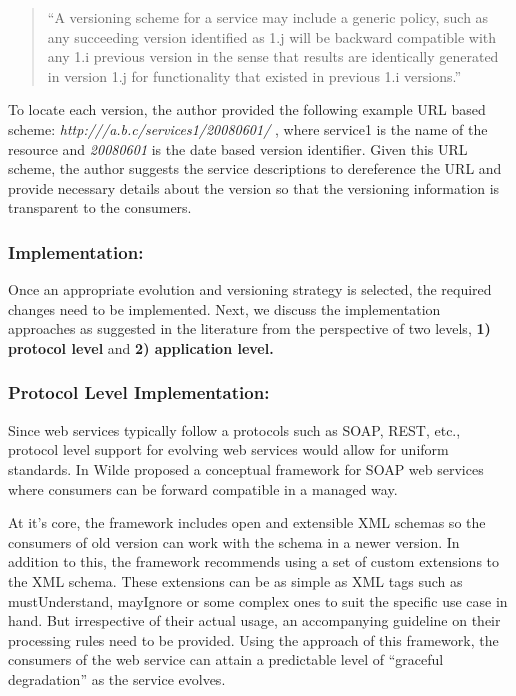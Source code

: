 \documentclass[runningheads,a4paper]{llncs}
\begin{document}
\begin{quote}
``A versioning scheme for a service may include a generic policy, such as any succeeding version identified as 1.j will be backward compatible with any 1.i previous version in the sense that results are identically generated in version 1.j for functionality that existed in previous 1.i versions.''
\end{quote}

To locate each version, the author provided the following example URL based scheme: \emph{http:///a.b.c/services1/20080601/} , where service1 is the name of the resource and \emph{20080601} is the date based version identifier. Given this URL scheme, the author suggests the service descriptions to dereference the URL and provide necessary details about the version so that the versioning information is transparent to the consumers.

\subsubsection{Implementation:}
Once an appropriate evolution and versioning strategy is selected, the required changes need to be implemented. Next, we discuss the implementation approaches as suggested in the literature from the perspective of two levels, \textbf{1) protocol level} and \textbf{2) application level.}

\subsubsection{Protocol Level Implementation:}
Since web services typically follow a protocols such as SOAP, REST, etc., protocol level support for evolving web services would allow for uniform standards. In \cite{wilde2004semantically} Wilde proposed a conceptual framework for SOAP web services where consumers can be forward compatible in a managed way.

At it’s core, the framework includes open and extensible XML schemas so the consumers of old version can work with the schema in a newer version. In addition to this, the framework recommends using a set of custom extensions to the XML schema. These extensions can be as simple as XML tags such as mustUnderstand, mayIgnore or some complex ones to suit the specific use case in hand. But irrespective of their actual usage, an accompanying guideline on their processing rules need to be provided. Using the approach of this framework, the consumers of the web service can attain a predictable level of ``graceful degradation'' as the service evolves.
\end{document}

